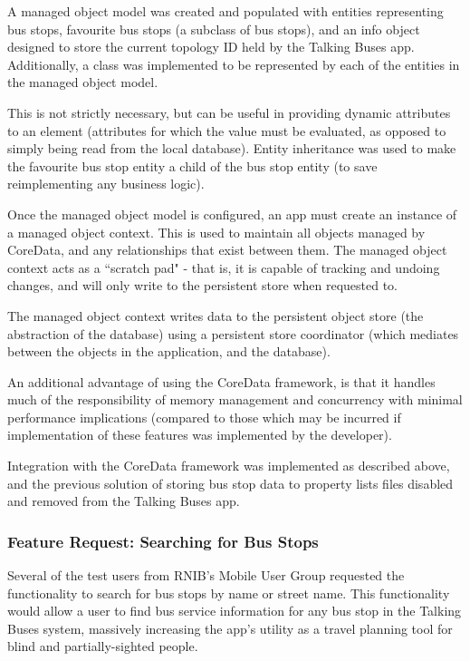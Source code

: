\documentclass[10pt,twocolumn]{article}
\newcommand{\citep}[1]{}
\begin{document}
A managed object model was created and populated with entities representing bus stops, favourite bus stops (a subclass of bus stops), and an info object designed to store the current topology ID held by the Talking Buses app. Additionally, a class was implemented to be represented by each of the entities in the managed object model.

This is not strictly necessary, but can be useful in providing dynamic attributes to an element (attributes for which the value must be evaluated, as opposed to simply being read from the local database). Entity inheritance was used to make the favourite bus stop entity a child of the bus stop entity (to save reimplementing any business logic).

Once the managed object model is configured, an app must create an instance of a managed object context. This is used to maintain all objects managed by CoreData, and any relationships that exist between them. The managed object context acts as a ``scratch pad" - that is, it is capable of tracking and undoing changes, and will only write to the persistent store when requested to.

The managed object context writes data to the persistent object store (the abstraction of the database) using a persistent store coordinator (which mediates between the objects in the application, and the database).

An additional advantage of using the CoreData framework, is that it handles much of the responsibility of memory management and concurrency with minimal performance implications (compared to those which may be incurred if implementation of these features was implemented by the developer)\citep{coreData}.

Integration with the CoreData framework was implemented as described above, and the previous solution of storing bus stop data to property lists files disabled and removed from the Talking Buses app.

\subsubsection{Feature Request: Searching for Bus Stops}
Several of the test users from RNIB's Mobile User Group requested the functionality to search for bus stops by name or street name. This functionality would allow a user to find bus service information for any bus stop in the Talking Buses system, massively increasing the app's utility as a travel planning tool for blind and partially-sighted people.
\end{document}
